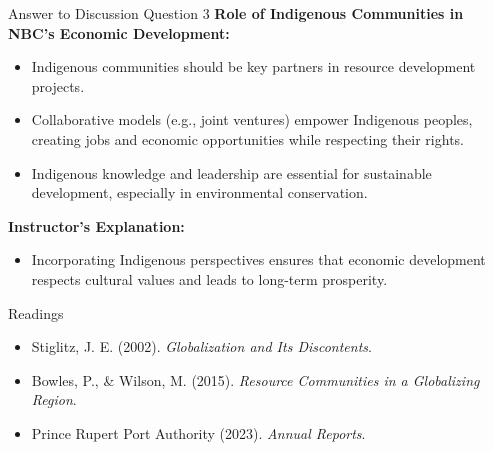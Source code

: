 \documentclass{beamer}
\begin{document}
\begin{frame}{Answer to Discussion Question 3}
    \textbf{Role of Indigenous Communities in NBC's Economic Development:}
    \begin{itemize}
        \item Indigenous communities should be key partners in resource development projects.
        \item Collaborative models (e.g., joint ventures) empower Indigenous peoples, creating jobs and economic opportunities while respecting their rights.
        \item Indigenous knowledge and leadership are essential for sustainable development, especially in environmental conservation.
    \end{itemize}
    \textbf{Instructor's Explanation:}
    \begin{itemize}
        \item Incorporating Indigenous perspectives ensures that economic development respects cultural values and leads to long-term prosperity.
    \end{itemize}
\end{frame}

\begin{frame}{Readings}
    \begin{itemize}
        \item Stiglitz, J. E. (2002). \textit{Globalization and Its Discontents}.
        \item Bowles, P., \& Wilson, M. (2015). \textit{Resource Communities in a Globalizing Region}.
        \item Prince Rupert Port Authority (2023). \textit{Annual Reports}.
    \end{itemize}
\end{frame}
\end{document}
